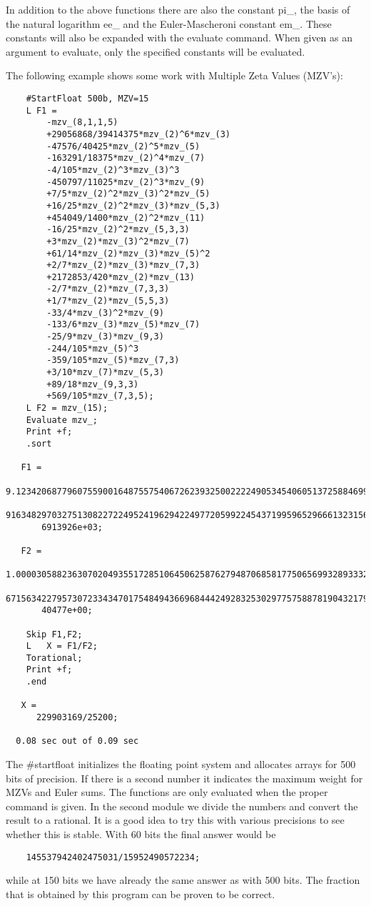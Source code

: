 In addition to the above functions there are also the constant 
pi\_, the basis of the natural logarithm ee\_ and the 
Euler-Mascheroni constant em\_. These constants will also be 
expanded with the evaluate command. When given as an argument to evaluate, 
only the specified constants will be evaluated.

The following example shows some work with Multiple Zeta Values (MZV's):
\begin{verbatim}
    #StartFloat 500b, MZV=15
    L F1 =
    	-mzv_(8,1,1,5)
    	+29056868/39414375*mzv_(2)^6*mzv_(3)
    	-47576/40425*mzv_(2)^5*mzv_(5)
    	-163291/18375*mzv_(2)^4*mzv_(7)
    	-4/105*mzv_(2)^3*mzv_(3)^3
    	-450797/11025*mzv_(2)^3*mzv_(9)
    	+7/5*mzv_(2)^2*mzv_(3)^2*mzv_(5)
    	+16/25*mzv_(2)^2*mzv_(3)*mzv_(5,3)
    	+454049/1400*mzv_(2)^2*mzv_(11)
    	-16/25*mzv_(2)^2*mzv_(5,3,3)
    	+3*mzv_(2)*mzv_(3)^2*mzv_(7)
    	+61/14*mzv_(2)*mzv_(3)*mzv_(5)^2
    	+2/7*mzv_(2)*mzv_(3)*mzv_(7,3)
    	+2172853/420*mzv_(2)*mzv_(13)
    	-2/7*mzv_(2)*mzv_(7,3,3)
    	+1/7*mzv_(2)*mzv_(5,5,3)
    	-33/4*mzv_(3)^2*mzv_(9)
    	-133/6*mzv_(3)*mzv_(5)*mzv_(7)
    	-25/9*mzv_(3)*mzv_(9,3)
    	-244/105*mzv_(5)^3
    	-359/105*mzv_(5)*mzv_(7,3)
    	+3/10*mzv_(7)*mzv_(5,3)
    	+89/18*mzv_(9,3,3)
    	+569/105*mzv_(7,3,5);
    L F2 = mzv_(15);
    Evaluate mzv_;
    Print +f;
    .sort

   F1 =
       9.1234206877960755900164875575406726239325002222490534540605137258846994\
       916348297032751308227224952419629422497720599224543719959652966613231560\
       6913926e+03;

   F2 =
       1.0000305882363070204935517285106450625876279487068581775065699328933322\
       671563422795730723343470175484943669684442492832530297757588781904321794\
       40477e+00;

    Skip F1,F2;
    L	X = F1/F2;
    Torational;
    Print +f;
    .end

   X =
      229903169/25200;

  0.08 sec out of 0.09 sec
\end{verbatim}
The \#startfloat initializes the floating point system and allocates arrays 
for 500 bits of precision. If there is a second number it indicates the 
maximum weight for MZVs and Euler sums. The functions are only evaluated 
when the proper command is given. In the second module we divide the 
numbers and convert the result to a rational. It is a good idea to try this 
with various precisions to see whether this is stable. With 60 bits the 
final answer would be
\begin{verbatim}
    145537942402475031/15952490572234;
\end{verbatim}
while at 150 bits we have already the same answer as with 500 bits. The 
fraction that is obtained by this program can be proven to be correct.
\vspace{3mm}

